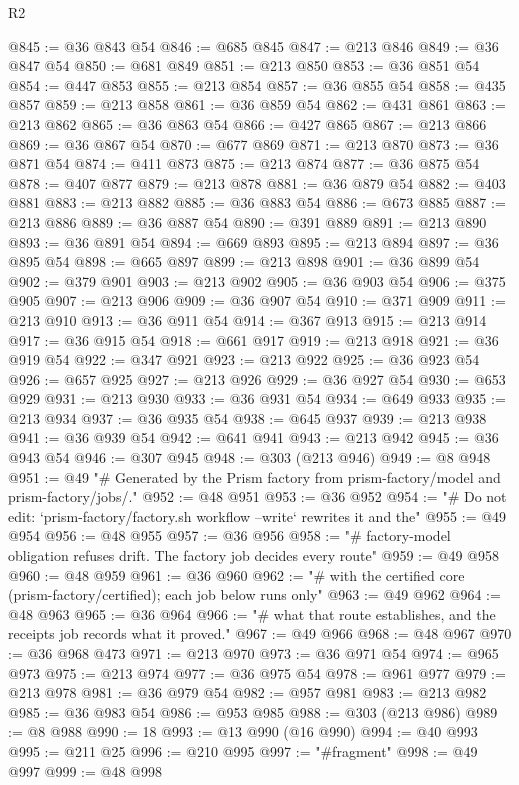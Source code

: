 \begin{lexlean}{R2}
\begin{coremodule}
@845 := @36 @843 @54
@846 := @685 @845
@847 := @213 @846
@849 := @36 @847 @54
@850 := @681 @849
@851 := @213 @850
@853 := @36 @851 @54
@854 := @447 @853
@855 := @213 @854
@857 := @36 @855 @54
@858 := @435 @857
@859 := @213 @858
@861 := @36 @859 @54
@862 := @431 @861
@863 := @213 @862
@865 := @36 @863 @54
@866 := @427 @865
@867 := @213 @866
@869 := @36 @867 @54
@870 := @677 @869
@871 := @213 @870
@873 := @36 @871 @54
@874 := @411 @873
@875 := @213 @874
@877 := @36 @875 @54
@878 := @407 @877
@879 := @213 @878
@881 := @36 @879 @54
@882 := @403 @881
@883 := @213 @882
@885 := @36 @883 @54
@886 := @673 @885
@887 := @213 @886
@889 := @36 @887 @54
@890 := @391 @889
@891 := @213 @890
@893 := @36 @891 @54
@894 := @669 @893
@895 := @213 @894
@897 := @36 @895 @54
@898 := @665 @897
@899 := @213 @898
@901 := @36 @899 @54
@902 := @379 @901
@903 := @213 @902
@905 := @36 @903 @54
@906 := @375 @905
@907 := @213 @906
@909 := @36 @907 @54
@910 := @371 @909
@911 := @213 @910
@913 := @36 @911 @54
@914 := @367 @913
@915 := @213 @914
@917 := @36 @915 @54
@918 := @661 @917
@919 := @213 @918
@921 := @36 @919 @54
@922 := @347 @921
@923 := @213 @922
@925 := @36 @923 @54
@926 := @657 @925
@927 := @213 @926
@929 := @36 @927 @54
@930 := @653 @929
@931 := @213 @930
@933 := @36 @931 @54
@934 := @649 @933
@935 := @213 @934
@937 := @36 @935 @54
@938 := @645 @937
@939 := @213 @938
@941 := @36 @939 @54
@942 := @641 @941
@943 := @213 @942
@945 := @36 @943 @54
@946 := @307 @945
@948 := @303 (@213 @946)
@949 := @8 @948
@951 := @49 "# Generated by the Prism factory from prism-factory/model and prism-factory/jobs/."
@952 := @48 @951
@953 := @36 @952
@954 := "# Do not edit: `prism-factory/factory.sh workflow --write` rewrites it and the"
@955 := @49 @954
@956 := @48 @955
@957 := @36 @956
@958 := "# factory-model obligation refuses drift. The factory job decides every route"
@959 := @49 @958
@960 := @48 @959
@961 := @36 @960
@962 := "# with the certified core (prism-factory/certified); each job below runs only"
@963 := @49 @962
@964 := @48 @963
@965 := @36 @964
@966 := "# what that route establishes, and the receipts job records what it proved."
@967 := @49 @966
@968 := @48 @967
@970 := @36 @968 @473
@971 := @213 @970
@973 := @36 @971 @54
@974 := @965 @973
@975 := @213 @974
@977 := @36 @975 @54
@978 := @961 @977
@979 := @213 @978
@981 := @36 @979 @54
@982 := @957 @981
@983 := @213 @982
@985 := @36 @983 @54
@986 := @953 @985
@988 := @303 (@213 @986)
@989 := @8 @988
@990 := 18
@993 := @13 @990 (@16 @990)
@994 := @40 @993
@995 := @211 @25
@996 := @210 @995
@997 := "#fragment"
@998 := @49 @997
@999 := @48 @998

\end{coremodule}
\end{lexlean}
